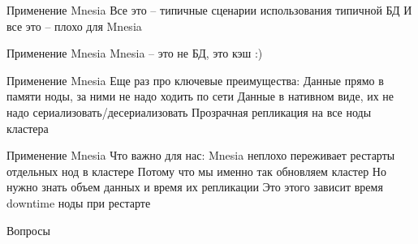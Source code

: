 \documentclass[9pt]{beamer}
\begin{document}
\begin{frame}
 Применение Mnesia
Все это -- типичные сценарии использования типичной БД
И все это -- плохо для Mnesia
\end{frame}

\begin{frame}
 Применение Mnesia
Mnesia -- это не БД, это кэш :)
\end{frame}

\begin{frame}
 Применение Mnesia
Еще раз про ключевые преимущества:
Данные прямо в памяти ноды, за ними не надо ходить по сети
Данные в нативном виде, их не надо сериализовать/десериализовать
Прозрачная репликация на все ноды кластера
\end{frame}

\begin{frame}
 Применение Mnesia
Что важно для нас:
Mnesia неплохо переживает рестарты отдельных нод в кластере
Потому что мы именно так обновляем кластер
Но нужно знать объем данных и время их репликации
Это этого зависит время downtime ноды при рестарте
\end{frame}

\begin{frame}
 Вопросы
\end{frame}
\end{document}
